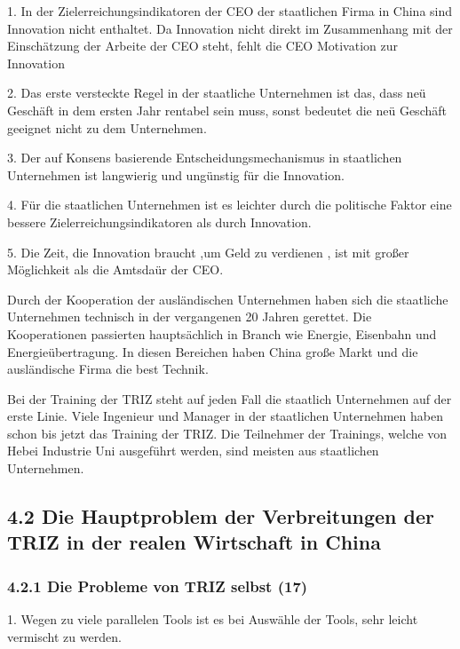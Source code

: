 \documentclass[11pt,a4paper]{article}
\begin{document}
1. In der Zielerreichungsindikatoren der CEO der staatlichen Firma in China
sind Innovation nicht enthaltet. Da Innovation nicht direkt im Zusammenhang
mit der Einschätzung der Arbeite der CEO steht, fehlt die CEO Motivation zur
Innovation

2. Das erste versteckte Regel in der staatliche Unternehmen ist  das, dass
neü Geschäft  in dem ersten Jahr rentabel sein muss, sonst bedeutet die neü
Geschäft geeignet nicht zu dem Unternehmen.

3. Der auf Konsens basierende Entscheidungsmechanismus in staatlichen
Unternehmen ist langwierig und ungünstig für die Innovation.

4.  Für die staatlichen Unternehmen ist es leichter durch die politische
Faktor eine bessere Zielerreichungsindikatoren als durch Innovation.

5. Die Zeit, die Innovation braucht ,um Geld zu  verdienen , ist  mit großer
Möglichkeit als die Amtsdaür der CEO.

Durch der Kooperation der ausländischen Unternehmen haben sich die staatliche
Unternehmen technisch in der vergangenen 20 Jahren gerettet.  Die
Kooperationen passierten hauptsächlich in Branch wie Energie, Eisenbahn und
Energieübertragung. In diesen Bereichen haben China große Markt und die
ausländische Firma die best Technik.

Bei der Training der TRIZ steht auf jeden Fall die staatlich Unternehmen auf
der erste Linie. Viele Ingenieur und Manager in der staatlichen Unternehmen
haben schon bis jetzt das Training der TRIZ. Die Teilnehmer der Trainings,
welche von Hebei Industrie Uni ausgeführt werden, sind meisten aus staatlichen
Unternehmen. 

\subsection{4.2  Die Hauptproblem der Verbreitungen der TRIZ in der realen
  Wirtschaft in China}

\subsubsection{4.2.1 Die Probleme von TRIZ selbst (17)}

1. Wegen zu viele parallelen Tools ist es bei Auswähle der Tools, sehr leicht
vermischt zu werden.
\end{document}
